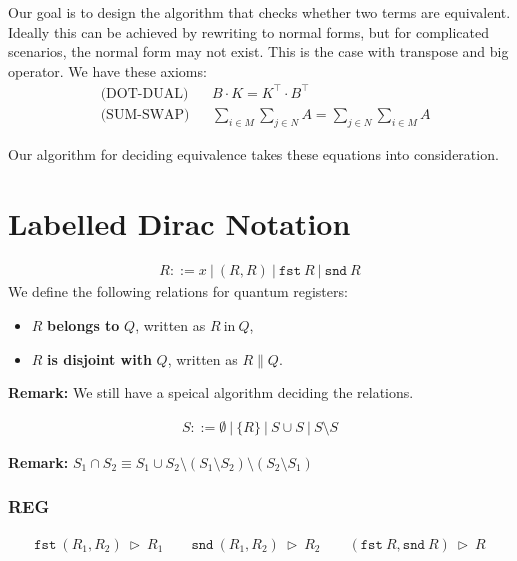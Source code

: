 \documentclass[manuscript, review, timestamp]{acmart}
\newcommand*{\fst}{\texttt{fst}}
\newcommand*{\snd}{\texttt{snd}}
\newcommand*{\reduce}{\ \triangleright\ }
\begin{document}
Our goal is to design the algorithm that checks whether two terms are equivalent. Ideally this can be achieved by rewriting to normal forms, but for complicated scenarios, the normal form may not exist. This is the case with transpose and big operator. We have these axioms: 
\begin{align*}
& \text{(DOT-DUAL)} && B \cdot K = K^\top \cdot B^\top \\
& \text{(SUM-SWAP)} && \sum_{i \in M} \sum_{j \in N} A = \sum_{j \in N} \sum_{i \in M} A 
\end{align*}

Our algorithm for deciding equivalence takes these equations into consideration.


\section{Labelled Dirac Notation}

\begin{definition}
  \begin{align*}
    R ::= x\ |\ (R, R)\ |\ \fst\ R\ |\ \snd\ R
  \end{align*}
  We define the following relations for quantum registers:
  \begin{itemize}
    \item $R$ \textbf{belongs to} $Q$, written as $R\ \text{in}\ Q$,
    \item $R$ \textbf{is disjoint with} $Q$, written as $R \| Q$.
  \end{itemize}
\end{definition}

\textbf{Remark:} We still have a speical algorithm deciding the relations.

\begin{definition}
  \begin{align*}
    S ::= \emptyset\ |\ \{ R \} \ |\ S \cup S\ |\ S \setminus S
  \end{align*}
\end{definition}

\textbf{Remark: } $ S_1 \cap S_2 \equiv S_1 \cup S_2 \setminus (S_1 \setminus S_2) \setminus (S_2 \setminus S_1) $

\subsubsection*{\textsf{REG}}
\begin{gather*}
  \fst\ (R_1, R_2) \reduce R_1 \qquad 
  \snd\ (R_1, R_2) \reduce R_2 \qquad
  (\fst\ R, \snd\ R) \reduce R
\end{gather*}
\end{document}
